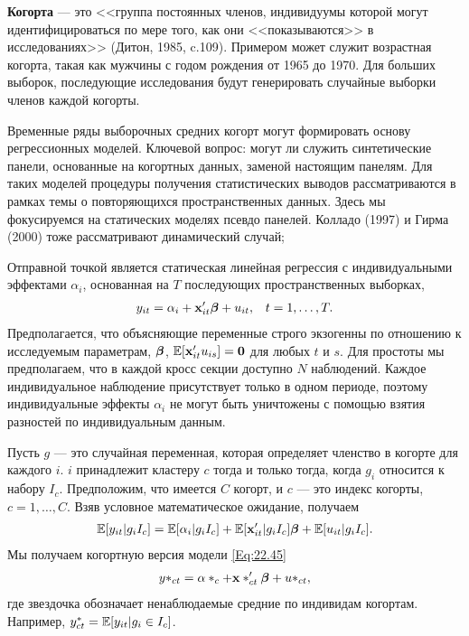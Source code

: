 \textbf{Когорта} --- это <<группа постоянных членов, индивидуумы которой могут идентифицироваться по мере того, как они <<показываются>> в исследованиях>> (Дитон, 1985, c.109). Примером может служит возрастная когорта, такая как мужчины с годом рождения от 1965 до 1970. Для больших выборок, последующие исследования будут генерировать случайные выборки членов каждой когорты.

Временные ряды выборочных средних когорт могут формировать основу регрессионных моделей. Ключевой вопрос: могут ли служить синтетические панели, основанные на когортных данных, заменой настоящим панелям. Для таких моделей процедуры получения статистических выводов рассматриваются в рамках темы о повторяющихся пространственных данных. Здесь мы фокусируемся на статических моделях псевдо панелей. Колладо (1997) и Гирма (2000) тоже рассматривают динамический случай;

Отправной точкой является статическая линейная регрессия с индивидуальными эффектами $\alpha_i$, основанная на $T$ последующих пространственных выборках,
 \begin{align}
& y_{it}=\alpha_i+\mathbf{x}'_{it} \bm{\beta} + u_{it},
& t=1, \dots, T.
\label{Eq:22.45}
\end{align}
Предполагается, что объясняющие переменные строго экзогенны по отношению к исследуемым параметрам, $\bm{\beta}$, $\mathbb{E}[\mathbf{x}'_{it} u_{is}]=\mathbf 0$ для любых $t$ и $s$. Для простоты мы предполагаем, что в каждой кросс секции доступно $N$ наблюдений. Каждое индивидуальное наблюдение присутствует только в одном периоде, поэтому индивидуальные эффекты $\alpha_i$ не могут быть уничтожены с помощью взятия разностей по индивидуальным данным.

Пусть $g$  --- это случайная переменная, которая определяет членство в когорте для каждого $i$.  $i$ принадлежит кластеру $c$ тогда и только тогда, когда $g_i$ относится к набору $I_c$. Предположим, что имеется  $C$ когорт, и $c$ --- это индекс когорты, $c=1, \dots, C$. Взяв условное математическое ожидание, получаем
 \begin{align}
\mathbb{E}[y_{it}|g_i I_c]=\mathbb{E}[\alpha_i|g_i I_c]+\mathbb{E}[\mathbf{x}'_{it}|g_i I_c]\bm{\beta}+\mathbb{E}[u_{it}|g_i I_c].
\label{Eq:22.46}
\end{align}
Мы получаем когортную версия модели \ref{Eq:22.45}
 \begin{align}
y*_{ct}=\alpha*_c+\mathbf{x}*_{ct}'\bm{\beta} +u*_{ct},
\label{Eq:22.47}
\end{align}
где звездочка обозначает ненаблюдаемые средние по индивидам когортам. Например, $y_{ct}^*=\mathbb{E}[y_{it}|g_i \in I_c]$.

